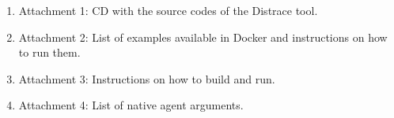 \documentclass[12pt,a4paper]{report}
\let\openright=\clearpage
\begin{document}


\setcounter{tocdepth}{1}
\tableofcontents
















\begin{enumerate}
	\item Attachment 1: CD with the source codes of the Distrace tool.
	\item Attachment 2: List of examples available in Docker and instructions on how to run them.
	\item Attachment 3: Instructions on how to build and run.
	\item Attachment 4: List of native agent arguments.
	\end{enumerate}
\openright





\end{document}
